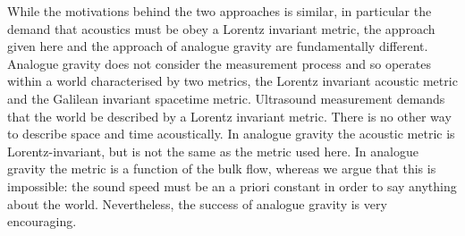 \documentclass[10pt, fleqn,final,showtrims,oldfontcommands, article,a4paper,oneside]{memoir} %
\begin{document}
While the motivations behind the two approaches is similar, in particular the demand that acoustics must be obey a Lorentz invariant metric,
the approach given here and the approach of analogue gravity are fundamentally different.
Analogue gravity does not consider the measurement process and so operates within a world characterised by two metrics, 
the Lorentz invariant acoustic metric and the Galilean invariant spacetime  metric.
Ultrasound measurement demands that the world be described by a Lorentz invariant metric.
There is no other way to describe space and time acoustically.
In analogue gravity the acoustic metric is Lorentz-invariant, but is not the same as the metric used here.
In analogue gravity the metric is a function of the bulk flow,
whereas  we argue that this is impossible:
the sound speed must be an a priori constant in order to say anything about the world.
Nevertheless, the success of analogue gravity is very encouraging.




\end{document}
